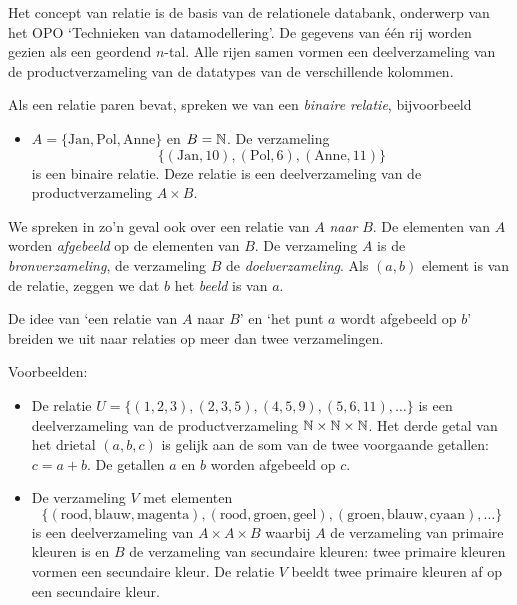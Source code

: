 Het concept van relatie is de basis van de relationele databank, onderwerp van het OPO `Technieken van datamodellering'. De gegevens van \'e\'en rij worden gezien als een geordend $n$-tal. Alle rijen samen vormen een deelverzameling van de productverzameling van de  datatypes van de verschillende kolommen.

Als een relatie paren bevat, spreken we van een \emph{binaire relatie}, bijvoorbeeld
\begin{itemize}
\item $A=\{\mathrm{Jan},\mathrm{Pol},\mathrm{Anne}\}$ en $B=\mathbb{N}$. De verzameling
      \[ \{(\mathrm{Jan},10),(\mathrm{Pol},6),(\mathrm{Anne},11) \} \]
      is een binaire relatie. Deze relatie is een deelverzameling van de productverzameling $A\times B$.
\end{itemize}
We spreken in zo'n geval ook over een relatie van $A$ \emph{naar} $B$. De elementen van $A$ worden \emph{afgebeeld} op de elementen van $B$.
De verzameling $A$ is de \emph{bronverzameling},
de verzameling $B$ de \emph{doelverzameling}. Als $(a,b)$ element is van de relatie, zeggen we dat $b$ het \emph{beeld} is van $a$.

De idee van `een relatie van $A$ naar $B$' en `het punt $a$ wordt afgebeeld op $b$' breiden we uit naar relaties op meer dan twee verzamelingen. 

\begin{samepage}
Voorbeelden:
\begin{itemize}
  \item De relatie $U=\{(1,2,3),(2,3,5),(4,5,9), (5,6,11),\dots\}$ is een deelverzameling
        van de productverzameling $\mathbb{N}\times\mathbb{N}\times\mathbb{N}$.
        Het derde getal van het drietal $(a,b,c)$ is gelijk aan de som van de twee
        voorgaande getallen: $c=a+b$. De getallen $a$ en $b$ worden afgebeeld op $c$.
  \item De verzameling $V$ met elementen
        \[ \{(\text{rood},\text{blauw},\text{magenta}), (\text{rood},\text{groen},\text{geel}), (\text{groen},\text{blauw},\text{cyaan}),\dots\} \]
        is een deelverzameling van $A\times A\times B$ waarbij $A$ de verzameling van primaire kleuren is en $B$ de verzameling van secundaire kleuren:
        twee primaire kleuren vormen een secundaire kleur. De relatie $V$ beeldt twee primaire kleuren af op een secundaire kleur.
\end{itemize}
\end{samepage}

